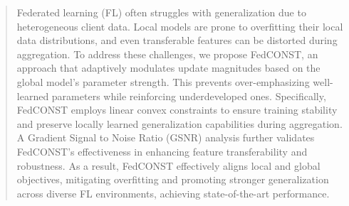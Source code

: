 \documentclass{article}
\theoremstyle{plain}
\theoremstyle{definition}
\theoremstyle{remark}
\begin{document}
\printAffiliationsAndNotice{}  %

\begin{abstract}
Federated learning (FL) often struggles with generalization due to heterogeneous client data. Local models are prone to overfitting their local data distributions, and even transferable features can be distorted during aggregation. To address these challenges, we propose FedCONST, an approach that adaptively modulates update magnitudes based on the global model’s parameter strength. This prevents over-emphasizing well-learned parameters while reinforcing underdeveloped ones. Specifically, FedCONST employs linear convex constraints to ensure training stability and preserve locally learned generalization capabilities during aggregation. A Gradient Signal to Noise Ratio (GSNR) analysis further validates FedCONST's effectiveness in enhancing feature transferability and robustness. As a result, FedCONST effectively aligns local and global objectives, mitigating overfitting and promoting stronger generalization across diverse FL environments, achieving state-of-the-art performance.
\end{abstract}

\end{document}
